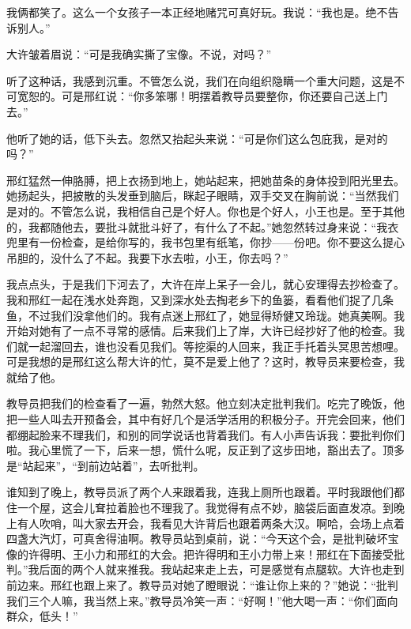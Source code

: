 我俩都笑了。这么一个女孩子一本正经地赌咒可真好玩。我说：“我也是。绝不告诉别人。” 

大许皱着眉说：“可是我确实撕了宝像。不说，对吗？” 

听了这种话，我感到沉重。不管怎么说，我们在向组织隐瞒一个重大问题，这是不可宽恕的。可是邢红说：“你多笨哪！明摆着教导员要整你，你还要自己送上门去。” 

他听了她的话，低下头去。忽然又抬起头来说：“可是你们这么包庇我，是对的吗？” 

邢红猛然一伸胳膊，把上衣扬到地上，她站起来，把她苗条的身体投到阳光里去。她扬起头，把披散的头发垂到脑后，眯起子眼睛，双手交叉在胸前说：“当然我们是对的。不管怎么说，我相信自己是个好人。你也是个好人，小王也是。至于其他的，我都随他去，要批斗就批斗好了，有什么了不起。”她忽然转过身来说：“我衣兜里有一份检查，是给你写的，我书包里有纸笔，你抄——份吧。你不要这么提心吊胆的，没什么了不起。我要下水去啦，小王，你去吗？” 

我点点头，于是我们下河去了，大许在岸上呆子一会儿，就心安理得去抄检查了。我和邢红一起在浅水处奔跑，又到深水处去掏老乡下的鱼篓，看看他们捉了几条鱼，不过我们没拿他们的。我有点迷上邢红了，她显得矫健又玲珑。她真美啊。我开始对她有了一点不寻常的感情。后来我们上了岸，大许已经抄好了他的检查。我们就一起溜回去，谁也没看见我们。等挖渠的人回来，我正手托着头冥思苦想哩。可是我想的是邢红这么帮大许的忙，莫不是爱上他了？这时，教导员来要检查，我就给了他。 

教导员把我们的检查看了一遍，勃然大怒。他立刻决定批判我们。吃完了晚饭，他把一些人叫去开预备会，其中有好几个是活学活用的积极分子。开完会回来，他们都绷起脸来不理我们，和别的同学说话也背着我们。有人小声告诉我：要批判你们啦。我心里慌了一下，后来一想，慌什么呢，反正到了这步田地，豁出去了。顶多是“站起来”，“到前边站着”，去听批判。 

谁知到了晚上，教导员派了两个人来跟着我，连我上厕所也跟着。平时我跟他们都住一个屋，这会儿耷拉着脸也不理我了。我觉得有点不妙，脑袋后面直发凉。到晚上有人吹哨，叫大家去开会，我看见大许背后也跟着两条大汉。啊哈，会场上点着四盏大汽灯，可真舍得油啊。教导员站到桌前，说：“今天这个会，是批判破坏宝像的许得明、王小力和邢红的大会。把许得明和王小力带上来！邢红在下面接受批判。”我后面的两个人就来推我。我站起来走上去，可是感觉有点腿软。大许也走到前边来。邢红也跟上来了。教导员对她了瞪眼说：“谁让你上来的？”她说：“批判我们三个人嘛，我当然上来。”教导员冷笑一声：“好啊！”他大喝一声：“你们面向群众，低头！” 


